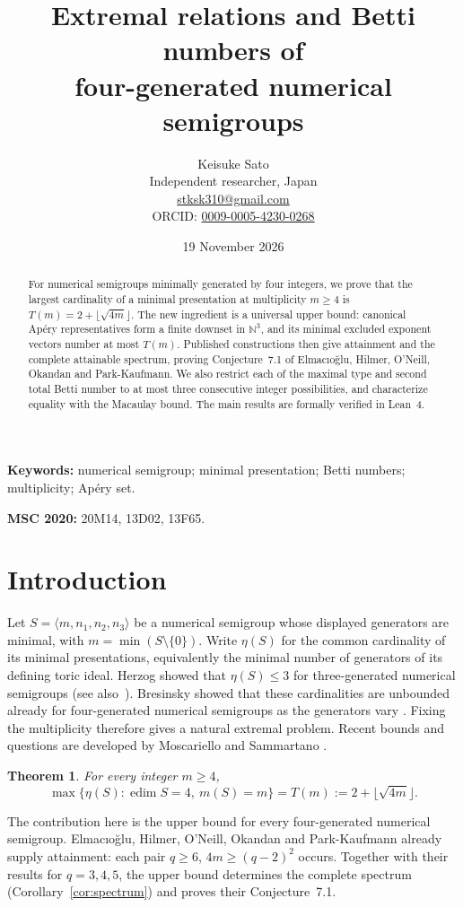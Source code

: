 \documentclass[11pt]{article}
\title{Extremal relations and Betti numbers of\\four-generated numerical semigroups}
\author{Keisuke Sato\\Independent researcher, Japan\\
\href{mailto:stksk310@gmail.com}{stksk310@gmail.com}\\
ORCID: \href{https://orcid.org/0009-0005-4230-0268}{0009-0005-4230-0268}}
\date{19 November 2026}
\newtheorem{theorem}{Theorem}[section]
\theoremstyle{definition}
\theoremstyle{remark}
\theoremstyle{plain}
\DeclareMathOperator{\edim}{edim}
\begin{document}
\maketitle
\begin{abstract}
For numerical semigroups minimally generated by four integers, we prove that
the largest cardinality of a minimal presentation at multiplicity $m\ge4$ is
$T(m)=2+\lfloor\sqrt{4m}\rfloor$.
The new ingredient is a universal upper bound: canonical Ap\'ery
representatives form a finite downset in $\mathbb N^3$, and its minimal
excluded exponent vectors number at most $T(m)$. Published constructions then give attainment
and the complete attainable spectrum, proving Conjecture~7.1 of
Elmac\i{}o\u{g}lu, Hilmer, O'Neill, Okandan and Park-Kaufmann.
We also restrict each of the maximal type and second total Betti number
to at most three consecutive integer possibilities, and characterize
equality with the Macaulay bound. The main results are formally verified
in Lean~4.
\end{abstract}
\noindent\textbf{Keywords:} numerical semigroup; minimal presentation;
Betti numbers; multiplicity; Ap\'ery set.\par
\smallskip
\noindent\textbf{MSC 2020:} 20M14, 13D02, 13F65.

\section{Introduction}
Let $S=\langle m,n_1,n_2,n_3\rangle$ be a numerical semigroup whose
displayed generators are minimal, with $m=\min(S\setminus\{0\})$.
Write $\eta(S)$ for the common cardinality of its minimal presentations,
equivalently the minimal number of generators of its defining toric ideal.
Herzog showed that $\eta(S)\le3$ for three-generated numerical
semigroups \cite{Herzog70} (see also~\cite{HerzogStamate14}). Bresinsky showed that
these cardinalities are unbounded already for
four-generated numerical semigroups as the generators vary
\cite{Bresinsky75}. Fixing the multiplicity therefore gives a natural
extremal problem. Recent bounds and questions are developed by
Moscariello and Sammartano \cite{MS25,MSSurvey25}.

\begin{theorem}\label{thm:main}
For every integer $m\ge4$,
\[
\max\{\eta(S):\edim S=4,\ m(S)=m\}
=T(m):=2+\lfloor\sqrt{4m}\rfloor.
\]
\end{theorem}

The contribution here is the upper bound for every four-generated
numerical semigroup. Elmac\i{}o\u{g}lu, Hilmer, O'Neill, Okandan and
Park-Kaufmann \cite[Theorem~6.3]{EHOOPK24} already supply attainment:
each pair $q\ge6$, $4m\ge(q-2)^2$ occurs. Together with their results
for $q=3,4,5$, the upper bound determines the complete spectrum
(Corollary~\ref{cor:spectrum}) and proves their Conjecture~7.1.
\end{document}
